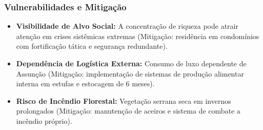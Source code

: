 \subsubsection{Vulnerabilidades e
Mitigação}

\begin{itemize}
\tightlist
\item
  \textbf{Visibilidade de Alvo Social:} A concentração de riqueza pode
  atrair atenção em crises sistêmicas extremas (Mitigação: residência em
  condomínios com fortificação tática e segurança redundante).
\item
  \textbf{Dependência de Logística Externa:} Consumo de luxo dependente
  de Assunção (Mitigação: implementação de sistemas de produção
  alimentar interna em estufas e estocagem de 6 meses).
\item
  \textbf{Risco de Incêndio Florestal:} Vegetação serrana seca em
  invernos prolongados (Mitigação: manutenção de aceiros e sistema de
  combate a incêndio próprio).
\end{itemize}

